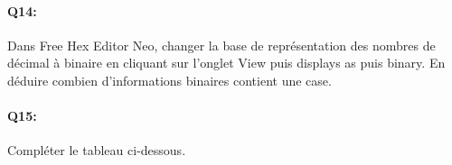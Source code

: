 \documentclass{article}
\begin{document}
\paragraph{Q14:}
Dans \og{}Free Hex Editor Neo\fg{}, 
changer la base de représentation des nombres de décimal à binaire en cliquant sur l'onglet \og{}View\fg{} puis \og{}displays as\fg{} puis \og{}binary\fg{}. 
En déduire combien d'informations binaires contient une case.
 
\vspace{1em}
\begin{Form}
	\TextField[name=r14,width=\linewidth,height=5em,multiline=true]{}
\end{Form}

\newpage

\paragraph{Q15:}
Compléter le tableau ci-dessous.
\end{document}
